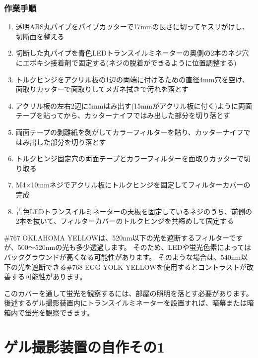 \documentclass[titlepage,10pt,a4paper,uplatex]{jsbook}
\begin{document}
\subsubsection{作業手順}
\begin{enumerate}
\item 透明ABS丸パイプをパイプカッターで17mmの長さに切ってヤスリがけし、切断面を整える
\item 切断した丸パイプを青色LEDトランスイルミネーターの奥側の2本のネジ穴にエポキシ接着剤で固定する(ネジの脱着ができるように位置調整する)
\item トルクヒンジをアクリル板の1辺の両端に付けるための直径4mm穴を空け、面取りカッターで面取りしてメガネ拭きで汚れを落とす
\item アクリル板の左右2辺に5mmはみ出す(15mmがアクリル板に付く)ように両面テープを貼ってから、カッターナイフではみ出した部分を切り落とす
\item 両面テープの剥離紙を剥がしてカラーフィルターを貼り、カッターナイフではみ出した部分を切り落とす
\item トルクヒンジ固定穴の両面テープとカラーフィルターを面取りカッターで切り取る
\item M4×10mmネジでアクリル板にトルクヒンジを固定してフィルターカバーの完成
\item 青色LEDトランスイルミネーターの天板を固定しているネジのうち、前側の2本を抜いて、フィルターカバーのトルクヒンジを共締めして固定する
\end{enumerate}

\#767 OKLAHOMA YELLOWは、520nm以下の光を遮断するフィルターですが、500～520nmの光も多少透過します。
そのため、LEDや蛍光色素によってはバックグラウンドが高くなる可能性があります。
そのような場合は、540nm以下の光を遮断できる\#768 EGG YOLK YELLOWを使用するとコントラストが改善する可能性があります。

このカバーを通して蛍光を観察するには、部屋の照明を落とす必要があります。
後述するゲル撮影装置内にトランスイルミネーターを設置すれば、暗幕または暗箱内で蛍光を観察できます。

\section{ゲル撮影装置の自作その1}\label{makinggelimager1}
\end{document}
